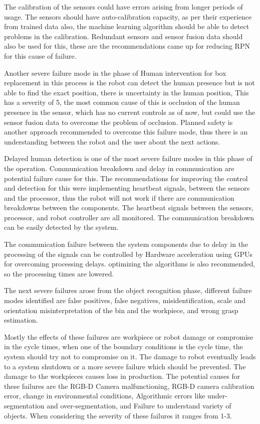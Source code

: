 {The calibration of the sensors could have errors arising from longer periods of usage. The sensors should have auto-calibration capacity, as per their experience from trained data also, the machine learning algorithm should be able to detect problems in the calibration. Redundant sensors and sensor fusion data should also be used for this, these are the recommendations came up for reducing RPN for this cause of failure.

Another severe failure mode in the phase of Human intervention for box replacement in this process is the robot can detect the human presence but is not able to find the exact position, there is uncertainty in the human position, This has a severity of 5, the most common cause of this is occlusion of the human presence in the sensor, which has no current controls as of now, but could use the sensor fusion data to overcome the problem of occlusion. Planned safety is another approach recommended to overcome this failure mode, thus there is an understanding between the robot and the user about the next actions.

Delayed human detection is one of the most severe failure modes in this phase of the operation.
Communication breakdown and delay in communication are potential failure cause for this. The recommendations for improving the control and detection for this were implementing heartbeat signals, between the sensors and the processor, thus the robot will not work if there are communication breakdowns between the components. The heartbeat signals between the sensors, processor, and robot controller are all monitored. The communication breakdown can be easily detected by the system.

The communication failure between the system components due to delay in the processing of the signals can be controlled by Hardware acceleration using GPUs for overcoming processing delays. optimizing the algorithms is also recommended, so the processing times are lowered.

The next severe failures arose from the object recognition phase, different failure modes identified are false positives, false negatives, misidentification, scale and orientation misinterpretation of the bin and the workpiece, and wrong grasp estimation.

Mostly the effects of these failures are workpiece or robot damage or compromise in the cycle times, when one of the boundary conditions is the cycle time, the system should try not to compromise on it. The damage to robot eventually leads to a system shutdown or a more severe failure which should be prevented. The damage to the workpieces causes loss in production. The potential causes for these failures are the RGB-D Camera malfunctioning, RGB-D camera calibration error, change in environmental conditions, Algorithmic errors like under-segmentation and over-segmentation, and Failure to understand variety of objects. When considering the severity of these failures it ranges from 1-3.

}
